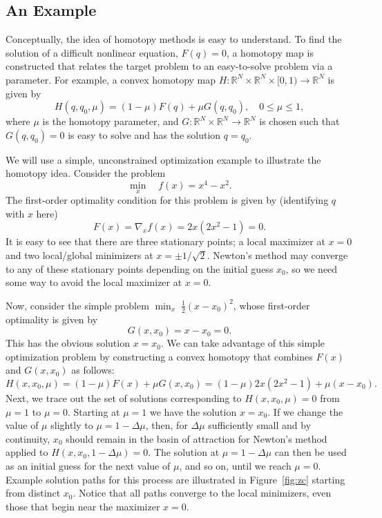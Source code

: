 \subsection{An Example}

Conceptually, the idea of homotopy methods is easy to understand. To find the
solution of a difficult nonlinear equation, $F(q)=0$, a homotopy map is
constructed that relates the target problem to an easy-to-solve problem via a
parameter.  For example, a convex homotopy map $H : \mathbb{R}^N \times
\mathbb{R}^{N} \times [0,1) \rightarrow \mathbb{R}^N$ is given by
\begin{equation}\label{eq:homotopy}
H(q, q_0, \mu) = (1-\mu) F(q) + \mu G(q,q_0),\quad 0 \leq \mu \leq 1,
\end{equation}
where $\mu$ is the homotopy parameter, and $G : \mathbb{R}^N\times\mathbb{R}^{N}
\rightarrow \mathbb{R}^N$ is chosen such that $G(q,q_0)=0$ is easy to solve and
has the solution $q=q_0$.  %

We will use a simple, unconstrained optimization example to illustrate the
homotopy idea. Consider the problem
\begin{equation*}
\min_x  \quad  f(x) = x^4 - x^2.
\end{equation*}
The first-order optimality condition for this problem is given by (identifying
$q$ with $x$ here)
\begin{equation*}
F(x) = \nabla_x f(x) = 2x(2x^2 - 1) = 0.
\end{equation*}
It is easy to see that there are three stationary points; a local maximizer at
$x=0$ and two local/global minimizers at $x=\pm 1/\sqrt{2}$.  Newton's method
may converge to any of these stationary points depending on the initial guess
$x_0$, so we need some way to avoid the local maximizer at $x=0$.

Now, consider the simple problem $\min_x \; \frac{1}{2}(x - x_0)^2$, whose
first-order optimality is given by
\begin{equation*}
G(x,x_0) = x - x_0 = 0.
\end{equation*}
This has the obvious solution $x=x_0$.  We can take advantage of this simple
optimization problem by constructing a convex homotopy that combines $F(x)$ and
$G(x,x_0)$ as follows:
\begin{equation*}
  H(x, x_0, \mu) = (1-\mu) F(x) + \mu G(x, x_0) = (1 - \mu) 2x(2x^2 -1) + \mu (x
  - x_0).
\end{equation*}
Next, we trace out the set of solutions corresponding to $H(x,x_0,\mu)=0$ from
$\mu=1$ to $\mu=0$.  Starting at $\mu=1$ we have the solution $x=x_0$.  If we
change the value of $\mu$ slightly to $\mu = 1 - \Delta \mu$, then, for $\Delta
\mu$ sufficiently small and by continuity, $x_0$ should remain in the basin of
attraction for Newton's method applied to $H(x, x_0, 1-\Delta \mu)=0$.  The
solution at $\mu= 1 - \Delta \mu$ can then be used as an initial guess for the
next value of $\mu$, and so on, until we reach $\mu = 0$.  Example solution
paths for this process are illustrated in Figure~\ref{fig:zc} starting from
distinct $x_0$.  Notice that all paths converge to the local minimizers, even
those that begin near the maximizer $x=0$.

